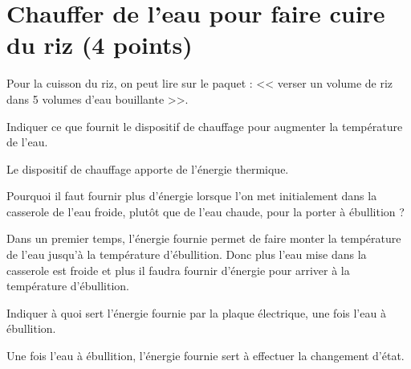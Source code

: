 \section{Chauffer de l'eau pour faire cuire du riz (4 points)}

Pour la cuisson du riz, on peut lire sur le paquet : << verser un volume de riz dans 5 volumes d'eau bouillante >>.

\begin{questions}
	\question[1\half] Indiquer ce que fournit le dispositif de chauffage pour augmenter la température de l'eau.

	\begin{solution}
		Le dispositif de chauffage apporte de l'énergie thermique.
	\end{solution}
	
	\question[1\half] Pourquoi il faut fournir plus d'énergie lorsque l'on met initialement dans la casserole de l'eau froide, plutôt que de l'eau chaude, pour la porter à ébullition ?
	\begin{solution}
		Dans un premier temps, l'énergie fournie permet de faire monter la température de l'eau jusqu'à la température d'ébullition. Donc plus l'eau mise dans la casserole est froide et plus il faudra fournir d'énergie pour arriver à la température d'ébullition.
	\end{solution}
	
	\question[1] Indiquer à quoi sert l'énergie fournie par la plaque électrique, une fois l'eau à ébullition.
	\begin{solution}
		Une fois l'eau à ébullition, l'énergie fournie sert à effectuer la changement d'état.
	\end{solution}

\end{questions}